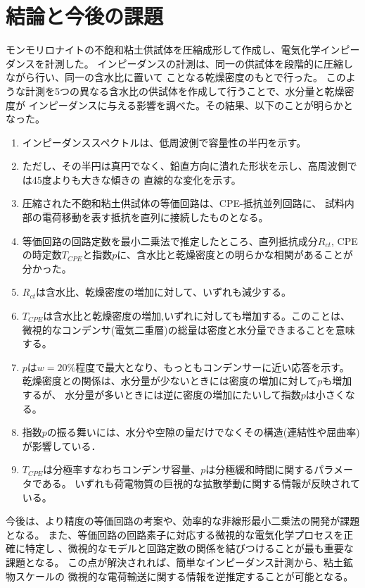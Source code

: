\documentclass[11pt,a4j]{mybook2}
\begin{document}
\chapter{結論と今後の課題}
モンモリロナイトの不飽和粘土供試体を圧縮成形して作成し、電気化学インピーダンスを計測した。
インピーダンスの計測は、同一の供試体を段階的に圧縮しながら行い、同一の含水比に置いて
ことなる乾燥密度のもとで行った。
このような計測を5つの異なる含水比の供試体を作成して行うことで、水分量と乾燥密度が
インピーダンスに与える影響を調べた。その結果、以下のことが明らかとなった。
\begin{enumerate}
\item
	インピーダンススペクトルは、低周波側で容量性の半円を示す。
\item
	ただし、その半円は真円でなく、鉛直方向に潰れた形状を示し、高周波側では45度よりも大きな傾きの
	直線的な変化を示す。
\item
	圧縮された不飽和粘土供試体の等価回路は、CPE-抵抗並列回路に、
	試料内部の電荷移動を表す抵抗を直列に接続したものとなる。
\item
	等価回路の回路定数を最小二乗法で推定したところ、直列抵抗成分$R_{ct}$,
		CPEの時定数$T_{CPE}$と指数$p$に、含水比と乾燥密度との明らかな相関があることが分かった。
\item
	$R_{ct}$は含水比、乾燥密度の増加に対して、いずれも減少する。
\item
	$T_{CPE}$は含水比と乾燥密度の増加,いずれに対しても増加する。このことは、
	微視的なコンデンサ(電気二重層)の総量は密度と水分量できまることを意味する。
\item
	$p$は$w=20\%$程度で最大となり、もっともコンデンサーに近い応答を示す。
	乾燥密度との関係は、水分量が少ないときには密度の増加に対して$p$も増加するが、
	水分量が多いときには逆に密度の増加にたいして指数$p$は小さくなる。
\item
	指数$p$の振る舞いには、水分や空隙の量だけでなくその構造(連結性や屈曲率)が影響している．
\item
	$T_{CPE}$は分極率すなわちコンデンサ容量、$p$は分極緩和時間に関するパラメータである。
	いずれも荷電物質の巨視的な拡散挙動に関する情報が反映されている。
\end{enumerate}
今後は、より精度の等価回路の考案や、効率的な非線形最小二乗法の開発が課題となる。
また、等価回路の回路素子に対応する微視的な電気化学プロセスを正確に特定し
、微視的なモデルと回路定数の関係を結びつけることが最も重要な課題となる。
この点が解決されれば、簡単なインピーダンス計測から、粘土鉱物スケールの
微視的な電荷輸送に関する情報を逆推定することが可能となる。
\end{document}
